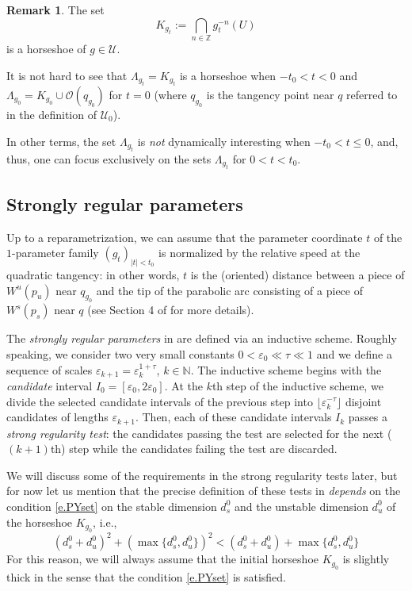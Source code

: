 \documentclass[12pt]{amsart}
\numberwithin{equation}{section}
\theoremstyle{definition}
\newtheorem{remark}[theorem]{Remark}
\newcommand{\<}{{\langle}}
\renewcommand{\>}{{\rangle}}
\begin{document}
\begin{remark} The set 
\begin{equation}\label{e.K-g}
K_{g_t}:=\bigcap\limits_{n\in\mathbb{Z}} g_t^{-n}(U)
\end{equation}
is a horseshoe of $g\in\mathcal{U}$.
\end{remark}

It is not hard to see that $\Lambda_{g_t}=K_{g_t}$ is a horseshoe when $-t_0<t<0$ and $\Lambda_{g_0}=K_{g_0}\cup\mathcal{O}(q_{g_0})$ for $t=0$ (where $q_{g_0}$ is the tangency point near $q$ referred to in the definition of $\mathcal{U}_0$). 

In other terms, the set $\Lambda_{g_t}$ is \emph{not} dynamically interesting when $-t_0<t\leq 0$, and, thus, one can focus exclusively on the sets $\Lambda_{g_t}$ for $0<t<t_0$. 

\subsection{Strongly regular parameters}\label{ss.strong-regular-1} Up to a reparametrization, we can assume that the parameter coordinate $t$ of the $1$-parameter family $(g_t)_{|t|<t_0}$ is normalized by the relative speed at the quadratic tangency: in other words, $t$ is the (oriented) distance between a piece of $W^u(p_u)$ near $q_{g_0}$ and the tip of the parabolic arc consisting of a piece of $W^s(p_s)$ near $q$ (see Section 4 of \cite{PY09} for more details). 

The \emph{strongly regular parameters} in \cite{PY09} are defined via an inductive scheme. Roughly speaking, we consider two very small constants $0<\varepsilon_0\ll\tau\ll 1$ and we define a sequence of scales $\varepsilon_{k+1} = \varepsilon_k^{1+\tau}$, $k\in\mathbb{N}$. The inductive scheme begins with the \emph{candidate} interval $I_0=[\varepsilon_0, 2\varepsilon_0]$. At the $k$th step of the inductive scheme, we divide the selected candidate intervals of the previous step into $\lfloor\varepsilon_k^{-\tau}\rfloor$ disjoint candidates of lengths $\varepsilon_{k+1}$. Then, each of these candidate intervals $I_k$ passes a \emph{strong regularity test}: the candidates passing the test are selected for the next ($(k+1)$th) step while the candidates failing the test are discarded. 

We will discuss some of the requirements in the strong regularity tests later, but for now let us mention that the precise definition of these tests in \cite{PY09} \emph{depends} on the condition \eqref{e.PYset} on the stable dimension $d_s^0$ and the unstable dimension $d_u^0$ of the horseshoe $K_{g_0}$, i.e., 
$$(d_s^0+d_u^0)^2+(\max\{d_s^0, d_u^0\})^2< (d_s^0+d_u^0) + \max\{d_s^0, d_u^0\}$$
For this reason, we will always assume that the initial horseshoe $K_{g_0}$ is slightly thick in the sense that the condition \eqref{e.PYset} is satisfied.
\end{document}
